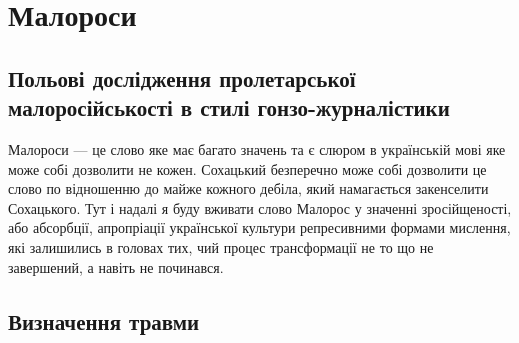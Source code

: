 
\section{Малороси}

\subsection{Польові дослідження пролетарської малоросійськості в стилі гонзо-журналістики}

Малороси --- це слово яке має багато значень та є слюром в
українській мові яке може собі дозволити не кожен. Сохацький
безперечно може собі дозволити це слово по відношенню до майже
кожного дебіла, який намагається закенселити Сохацького. Тут і
надалі я буду вживати слово Малорос у значенні зросійщеності,
або абсорбції, апропріації української культури репресивними
формами мислення, які залишились в головах тих, чий процес
трансформації не то що не завершений, а навіть не починався.

\subsection{Визначення травми}

